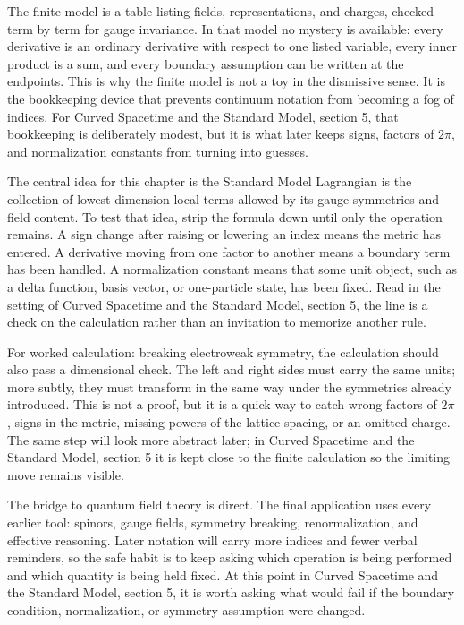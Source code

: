 The finite model is a table listing fields, representations, and charges, checked term by term for gauge invariance.  In that model no mystery is available: every derivative is an ordinary derivative with respect to one listed variable, every inner product is a sum, and every boundary assumption can be written at the endpoints.  This is why the finite model is not a toy in the dismissive sense.  It is the bookkeeping device that prevents continuum notation from becoming a fog of indices.  For Curved Spacetime and the Standard Model, section 5, that bookkeeping is deliberately modest, but it is what later keeps signs, factors of \(2\pi\), and normalization constants from turning into guesses.

The central idea for this chapter is the Standard Model Lagrangian is the collection of lowest-dimension local terms allowed by its gauge symmetries and field content.  To test that idea, strip the formula down until only the operation remains.  A sign change after raising or lowering an index means the metric has entered.  A derivative moving from one factor to another means a boundary term has been handled.  A normalization constant means that some unit object, such as a delta function, basis vector, or one-particle state, has been fixed.  Read in the setting of Curved Spacetime and the Standard Model, section 5, the line is a check on the calculation rather than an invitation to memorize another rule.

For worked calculation: breaking electroweak symmetry, the calculation should also pass a dimensional check.  The left and right sides must carry the same units; more subtly, they must transform in the same way under the symmetries already introduced.  This is not a proof, but it is a quick way to catch wrong factors of \(2\pi\), signs in the metric, missing powers of the lattice spacing, or an omitted charge.  The same step will look more abstract later; in Curved Spacetime and the Standard Model, section 5 it is kept close to the finite calculation so the limiting move remains visible.

The bridge to quantum field theory is direct.  The final application uses every earlier tool: spinors, gauge fields, symmetry breaking, renormalization, and effective reasoning.  Later notation will carry more indices and fewer verbal reminders, so the safe habit is to keep asking which operation is being performed and which quantity is being held fixed.  At this point in Curved Spacetime and the Standard Model, section 5, it is worth asking what would fail if the boundary condition, normalization, or symmetry assumption were changed.

